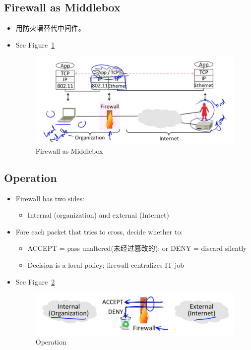 \documentclass[12pt]{ctexart}   %
\begin{document}
	\subsection{Firewall as Middlebox}
	\begin{itemize}
		\item 用防火墙替代中间件。
		\item See Figure~\ref{fig:10-7-4}
		  
		\begin{figure}[h!] %
		\centering
		\includegraphics[scale=0.7]{images/10-7-4}
		\caption{Firewall as Middlebox}
		\label{fig:10-7-4}
		\end{figure}
	\end{itemize}

	\subsection{Operation}
	\begin{itemize}
		\item Firewall has two sides:
		\begin{itemize}
			\item Internal (organization) and external (Internet) 
		\end{itemize}

		\item Fore each packet that tries to cross, decide whether to:
		\begin{itemize}
			\item ACCEPT = pass unaltered(未经过篡改的); or DENY = discard silently
			\item Decision is a local policy; firewall centralizes IT job
		\end{itemize}
		\item See Figure~\ref{fig:10-7-5}
		  
		\begin{figure}[h!] %
		\centering
		\includegraphics[scale=0.7]{images/10-7-5}
		\caption{Operation}
		\label{fig:10-7-5}
		\end{figure}
	\end{itemize}
\end{document}
